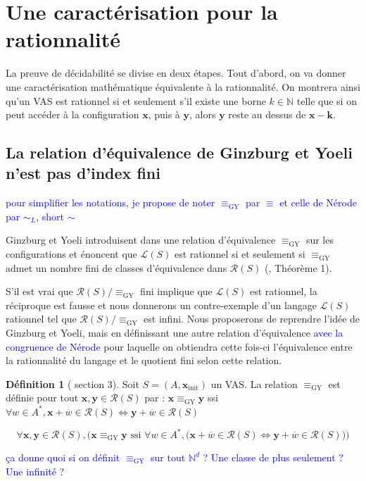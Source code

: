 \documentclass[a4paper,final]{article}
\theoremstyle{definition}
\newtheorem{Definition}[Theorem]{Définition}
\newcommand{\alain}[1]{\textcolor{blue}{#1}}
\newcommand{\N}{\ensuremath{\mathbb{N}}}
\newcommand{\lang}{\ensuremath{\mathcal{L}}}
\newcommand{\conf}{\ensuremath{\mathcal{R}}}
\newcommand{\vect}[1]{\ensuremath{\mathbf{#1}}}
\newcommand{\relGY}{\ensuremath{\equiv_\text{GY}}}
\newcommand{\ssi}{\ensuremath{\text{ ssi }}}
\newcommand{\equivaut}{\ensuremath{\Leftrightarrow}}
\newcommand{\xinit}{\ensuremath{\vect{x}_\text{init}}}
\newcommand{\valeur}[1]{\ensuremath{\overline{#1}}}
\begin{document}

\section{Une caractérisation pour la rationnalité}

La preuve de décidabilité se divise en deux étapes.
Tout d'abord, on va donner une caractérisation mathématique équivalente à la rationnalité.
On montrera ainsi qu'un VAS est rationnel si et seulement s'il existe une borne $k\in\N$ telle que si on peut accéder à la configuration $\vect{x}$, puis à $\vect{y}$, alors $\vect{y}$ reste au dessus de $\vect{x}-\vect{k}$.

\subsection{La relation d'équivalence de Ginzburg et Yoeli n'est pas d'index fini}
\alain{pour simplifier les notations, je propose de noter $\relGY$ par $\equiv$ et celle de Nérode par $\sim_L$, short $\sim$}

Ginzburg et Yoeli introduisent dans \cite{giyo80} une relation d'équivalence $\relGY$ sur les configurations et énoncent que $\lang(S)$ est rationnel si et seulement si $\relGY$ admet un nombre fini de classes d'équivalence dans $\conf(S)$ (\cite{giyo80}, Théorème 1).

S'il est vrai que $\conf(S)/\relGY$ fini implique que $\lang(S)$ est rationnel, la réciproque est fausse et nous donnerons un contre-exemple d'un langage $\lang(S)$ rationnel tel que $\conf(S)/\relGY$ est infini. 
Nous proposerons de reprendre l'idée de Ginzburg et Yoeli,
mais en définissant une autre relation d'équivalence \alain{avec la congruence de Nérode} pour laquelle on obtiendra cette fois-ci l'équivalence entre la rationnalité du langage et le quotient fini selon cette relation.

\begin{Definition}[\cite{giyo80} section 3]
Soit $S=(A,\xinit)$ un VAS. La relation $\relGY$ est définie pour tout $\vect{x},\vect{y}\in\conf(S)$ par : $ \vect{x}\relGY\vect{y}$  ssi 
 $ \forall w\in A^\ast, \vect{x} +\valeur{w}\in\conf(S) \equivaut \vect{y} +\valeur{w}\in\conf(S)$

$$\forall \vect{x},\vect{y}\in\conf(S), \Big(
\vect{x}\relGY\vect{y} \ssi \forall w\in A^\ast, \big( \vect{x} +\valeur{w}\in\conf(S) \equivaut \vect{y} +\valeur{w}\in\conf(S) \big) \Big)$$
\end{Definition}\alain{ça donne quoi si on définit $\relGY$ sur tout $\N^d$ ? Une classe de plus seulement ? Une infinité ?}
\end{document}
